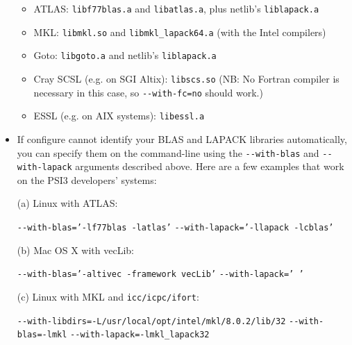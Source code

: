 \documentclass[12pt]{article}
\begin{document}
\begin{itemize}
\begin{itemize}  
    \item ATLAS: {\tt libf77blas.a} and {\tt libatlas.a}, plus netlib's
    {\tt liblapack.a}
    \item MKL: {\tt libmkl.so} and {\tt libmkl\_lapack64.a} (with the Intel compilers)
    \item Goto: {\tt libgoto.a} and netlib's {\tt liblapack.a}
    \item Cray SCSL (e.g. on SGI Altix): {\tt libscs.so} (NB: No Fortran compiler
      is necessary in this case, so {\tt -}{\tt -with-fc=no} should work.)
    \item ESSL (e.g. on AIX systems): {\tt libessl.a}
    \end{itemize}  
  \item If configure cannot identify your BLAS and LAPACK libraries
    automatically, you can specify them on the command-line using the
    {\tt -}{\tt -with-blas} and {\tt -}{\tt -with-lapack} arguments
    described above.  Here are a few examples that work on the PSI3
    developers' systems:
  
    (a) Linux with ATLAS:
  
    {\tt -}{\tt -with-blas='-lf77blas -latlas'} {\tt -}{\tt -with-lapack='-llapack -lcblas'}

    (b) Mac OS X with vecLib: 
  
    {\tt -}{\tt -with-blas='-altivec -framework vecLib'} {\tt -}{\tt -with-lapack=' '}
  
    (c) Linux with MKL and {\tt icc/icpc/ifort}: 
  
    {\tt -}{\tt -with-libdirs=-L/usr/local/opt/intel/mkl/8.0.2/lib/32} {\tt -}{\tt -with-blas=-lmkl} {\tt -}{\tt -with-lapack=-lmkl\_lapack32}
\end{itemize}
\end{document}
